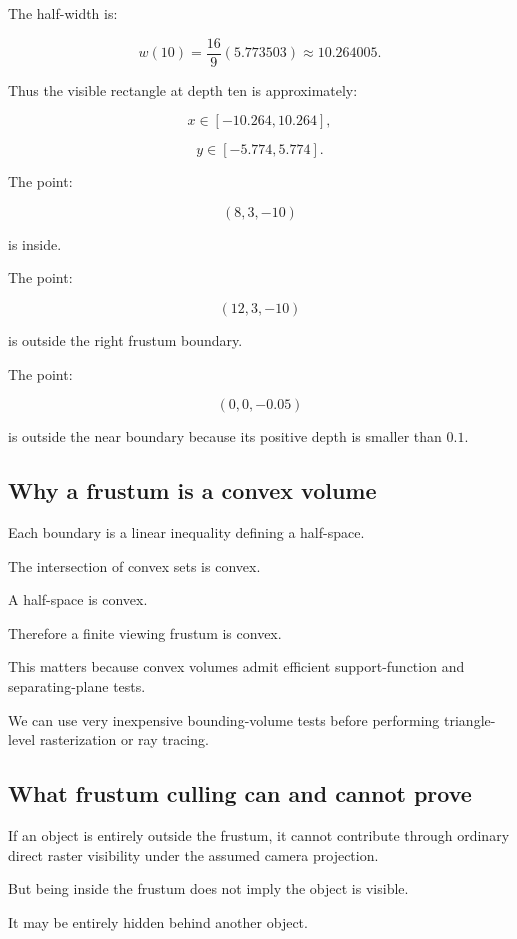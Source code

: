 The half-width is:

\[
 w(10)=\frac{16}{9}(5.773503)\approx10.264005.
\]

Thus the visible rectangle at depth ten is approximately:

\[
 x\in[-10.264,10.264],
\]

\[
 y\in[-5.774,5.774].
\]

The point:

\[
 (8,3,-10)
\]

is inside.

The point:

\[
 (12,3,-10)
\]

is outside the right frustum boundary.

The point:

\[
 (0,0,-0.05)
\]

is outside the near boundary because its positive depth is smaller than \(0.1\).

\subsection{Why a frustum is a convex volume}\label{02-foundations-ii-ch034-why-a-frustum-is-a-convex-volume}

Each boundary is a linear inequality defining a half-space.

The intersection of convex sets is convex.

A half-space is convex.

Therefore a finite viewing frustum is convex.

This matters because convex volumes admit efficient support-function and separating-plane tests.

We can use very inexpensive bounding-volume tests before performing triangle-level rasterization or ray tracing.

\subsection{What frustum culling can and cannot prove}\label{02-foundations-ii-ch034-what-frustum-culling-can-and-cannot-prove}

If an object is entirely outside the frustum, it cannot contribute through ordinary direct raster visibility under the assumed camera projection.

But being inside the frustum does not imply the object is visible.

It may be entirely hidden behind another object.

